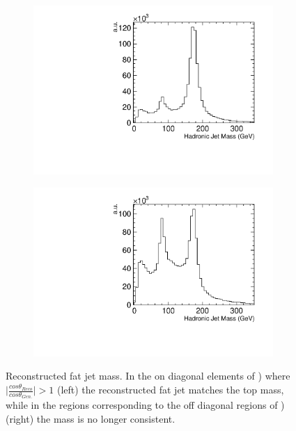\begin{figure}
  \centering
  \begin{subfigure}{.5\textwidth}
    \centering
    \includegraphics[width=1.0\textwidth]{TopAnalysis/figures/TopMassDiagonal.pdf}
  \end{subfigure}%
  \begin{subfigure}{.5\textwidth}
    \centering\captionsetup{width=.8\linewidth}%
    \includegraphics[width=1.0\textwidth]{TopAnalysis/figures/TopMassOffDiagonal.pdf}
  \end{subfigure}
  \caption[Reconstructed fat jet mass]{Reconstructed fat jet mass. In the on diagonal elements of ) where $\mid\frac{cos\theta_{Reco}}{cos\theta_{Gen.}}\mid >1$ (left) the reconstructed fat jet matches the top mass, while in the regions corresponding to the off diagonal regions of ) (right) the mass is no longer consistent.}
  \label{fig:diagonalTopMass}
\end{figure}


